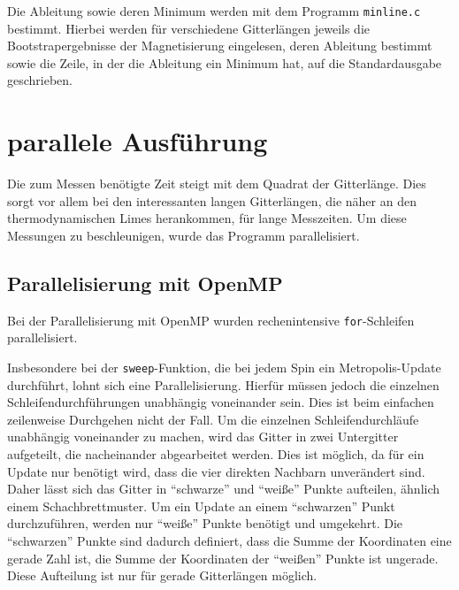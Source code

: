 	Die Ableitung sowie deren Minimum werden mit dem Programm \texttt{minline.c} bestimmt. Hierbei werden für verschiedene Gitterlängen jeweils die Bootstrapergebnisse der Magnetisierung eingelesen, deren Ableitung bestimmt sowie die Zeile, in der die Ableitung ein Minimum hat, auf die Standardausgabe geschrieben.
		
	
	\section{parallele Ausführung}
	\label{sec:parallelimplementierung}


	
	Die zum Messen benötigte Zeit steigt mit dem Quadrat der Gitterlänge. Dies sorgt vor allem bei den interessanten langen Gitterlängen, die näher an den thermodynamischen Limes herankommen, für lange Messzeiten. Um diese Messungen zu beschleunigen, wurde das Programm parallelisiert.
	
	\subsection{Parallelisierung mit OpenMP}
	\label{subsec:paropenmp}
	Bei der Parallelisierung mit OpenMP wurden rechenintensive \texttt{for}-Schleifen parallelisiert.
	
%	
%		
%	
	Insbesondere bei der \texttt{sweep}-Funktion, die bei jedem Spin ein Metropolis-Update durchführt, lohnt sich eine Parallelisierung. Hierfür müssen jedoch die einzelnen Schleifendurchführungen unabhängig voneinander sein. Dies ist beim einfachen zeilenweise Durchgehen nicht der Fall. 
	Um die einzelnen Schleifendurchläufe unabhängig voneinander zu machen, wird das Gitter in zwei Untergitter aufgeteilt, die nacheinander abgearbeitet werden. Dies ist möglich, da für ein Update nur benötigt wird, dass die vier direkten Nachbarn unverändert sind. Daher lässt sich das Gitter in \enquote{schwarze}
	und \enquote{weiße} Punkte aufteilen, ähnlich einem Schachbrettmuster. %
	Um ein Update an einem \enquote{schwarzen} Punkt durchzuführen, werden nur \enquote{weiße} Punkte benötigt und umgekehrt. Die \enquote{schwarzen} Punkte sind dadurch definiert, dass die Summe der Koordinaten eine gerade Zahl ist, die Summe der Koordinaten der \enquote{weißen} Punkte ist ungerade. Diese Aufteilung ist nur für gerade Gitterlängen möglich.
	
